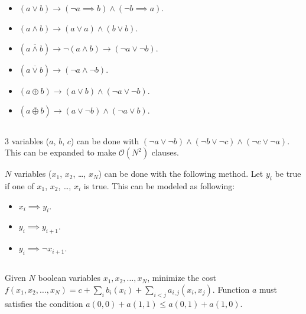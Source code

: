 \documentclass[landscape, 8pt, a4paper, oneside, twocolumn]{extarticle}
\begin{document}
\subsection{}
\subsection{}
\begin{itemize}
	\item $(a \vee b) \to (\neg a \implies b) \wedge (\neg b \implies a)$.
	\item $(a \wedge b) \to (a \vee a) \wedge (b \vee b)$.
	\item $(a \overline{\wedge} b) \to \neg (a \wedge b) \to (\neg a \vee \neg b)$.
	\item $(a \overline{\vee} b) \to (\neg a \wedge \neg b)$.
	\item $(a \oplus b) \to (a \vee b) \wedge (\neg a \vee \neg b)$.
	\item $(a \overline{\oplus} b) \to (a \vee \neg b) \wedge (\neg a \vee b)$.
\end{itemize}
\subsection{}
$3$ variables ($a$, $b$, $c$) can be done with $(\neg a \vee \neg b) \wedge (\neg b \vee \neg c) \wedge (\neg c \vee \neg a)$. This can be expanded to make $\mathcal O(N^2)$ clauses.

$N$ variables ($x_1$, $x_2$, \ldots, $x_N$) can be done with the following method. Let $y_i$ be true if one of $x_1$, $x_2$, \ldots, $x_i$ is true. This can be modeled as following:
\begin{itemize}
	\item $x_i \implies y_i$.
	\item $y_i \implies y_{i+1}$.
	\item $y_i \implies \neg x_{i+1}$.
\end{itemize}
\subsection{}
Given $N$ boolean variables $x_{1}, x_{2}, \ldots, x_{N}$, minimize the cost $f(x_1, x_2, \ldots, x_N) = c + \sum_{i} b_i(x_i) + \sum_{i<j} a_{i,j}(x_i, x_j)$. Function $a$ must satisfies the condition $a(0,0) + a(1,1) \leq a(0,1) + a(1,0)$.
\end{document}
